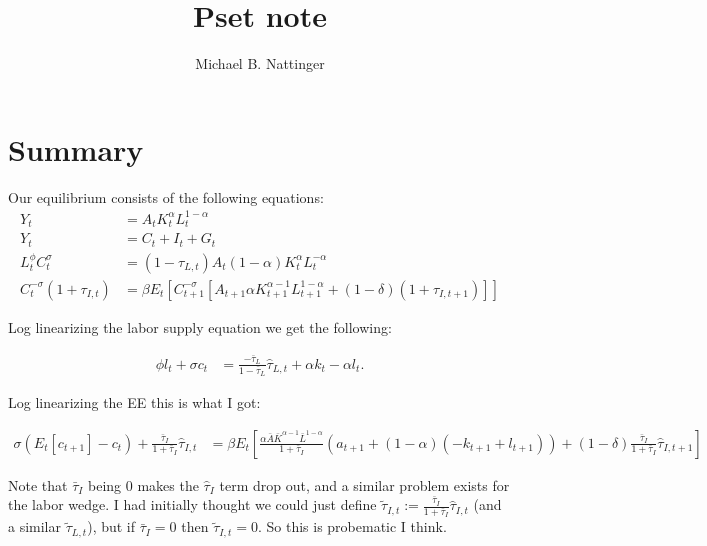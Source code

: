 \documentclass[11pt]{article} %
\title{Pset note}
\author{Michael B. Nattinger}
\begin{document}
\maketitle

\section{Summary}
Our equilibrium consists of the following equations:
\begin{align}
Y_{t} &= A_tK_t^{\alpha}L_t^{1-\alpha} \label{F}\\
Y_{t} &= C_{t} + I_{t} + G_{t} \label{Y}\\
L_{t}^{\phi}C_t^{\sigma} &= (1-\tau_{L,t})A_t(1-\alpha) K_t^{\alpha}L_t^{-\alpha} \label{L}\\
C_t^{-\sigma}(1+\tau_{I,t}) &= \beta E_t[C_{t+1}^{-\sigma}[A_{t+1}\alpha K_{t+1}^{\alpha-1}L_{t+1}^{1-\alpha} + (1-\delta)(1+\tau_{I,t+1})]] \label{EE}
\end{align}

Log linearizing the labor supply equation we get the following:

\begin{align}
\phi l_t + \sigma c_t &= \frac{-\bar{\tau}_{L}}{1-\bar{\tau}_{L}}\hat{\tau}_{L,t}+\alpha k_t -\alpha l_t. \label{l}
\end{align}

Log linearizing the EE this is what I got:
 
\begin{align}
 \sigma(E_t[c_{t+1}]-  c_t) + \frac{\bar{\tau}_{I}}{1+\bar{\tau}_{I}}\hat{\tau}_{I,t} &= \beta E_t\left[\frac{\alpha\bar{A} \bar{K}^{\alpha - 1} \bar{L}^{1-\alpha}}{1+\bar{\tau}_I}(a_{t+1} + (1-\alpha)(- k_{t+1} + l_{t+1})) + (1-\delta)\frac{\bar{\tau}_{I}}{1+\bar{\tau}_{I}}\hat{\tau}_{I,t+1} \right] \label{ee}
\end{align}

Note that $\bar{\tau}_{I}$ being 0 makes the $\hat{\tau}_I$ term drop out, and a similar problem exists for the labor wedge. I had initially thought we could just define $\tilde{\tau}_{I,t}:= \frac{\bar{\tau}_{I}}{1+\bar{\tau}_{I}}\hat{\tau}_{I,t}$ (and a similar $\tilde{\tau}_{L,t}$), but if $\bar{\tau}_{I} = 0$ then $\tilde{\tau}_{I,t} = 0$. So this is probematic I think.
\end{document}
